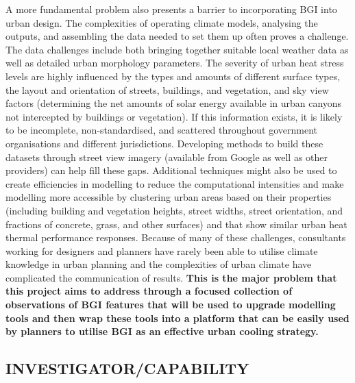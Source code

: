 A more fundamental problem also presents a barrier to incorporating BGI into urban design. The complexities of operating climate models, analysing the outputs, and assembling the data needed to set them up often proves a challenge. The data challenges include both bringing together suitable local weather data as well as detailed urban morphology parameters. The severity of urban heat stress levels are highly influenced by the types and amounts of different surface types, the layout and orientation of streets, buildings, and vegetation, and sky view factors (determining the net amounts of solar energy available in urban canyons not intercepted by buildings or vegetation). If this information exists, it is likely to be incomplete, non-standardised, and scattered throughout government organisations and different jurisdictions. Developing methods to build these datasets through street view imagery (available from Google as well as other providers) can help fill these gaps. Additional techniques might also be used to create efficiencies in modelling to reduce the computational intensities and make modelling more accessible by clustering urban areas based on their properties (including building and vegetation heights, street widths, street orientation, and fractions of concrete, grass, and other surfaces) and that show similar urban heat thermal performance responses. Because of many of these challenges, consultants working for designers and planners have rarely been able to utilise climate knowledge in urban planning\cite{Elasson2000} and the complexities of urban climate have complicated the communication of results\cite{Oke2006}. \textbf{This is the major problem that this project aims to address through a focused collection of observations of BGI features that will be used to upgrade modelling tools and then wrap these tools into a platform that can be easily used by planners to utilise BGI as an effective urban cooling strategy.}

\subsection*{\TitleFont INVESTIGATOR/CAPABILITY}




